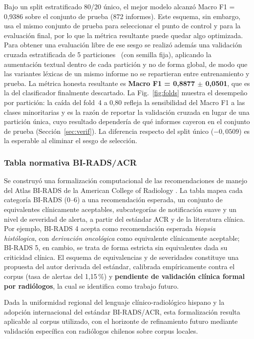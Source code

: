 \documentclass[10pt,journal,a4paper]{IEEEtran}
\begin{document}
Bajo un split estratificado 80/20 \'unico, el mejor modelo alcanz\'o Macro F1 = 0,9386 sobre el conjunto de prueba (872 informes). Este esquema, sin embargo, usa el mismo conjunto de prueba para seleccionar el punto de control y para la evaluaci\'on final, por lo que la m\'etrica resultante puede quedar algo optimizada. Para obtener una evaluaci\'on libre de ese sesgo se realiz\'o adem\'as una validaci\'on cruzada estratificada de 5 particiones~\cite{kohavi1995study} (con semilla fija), aplicando la aumentaci\'on textual dentro de cada partici\'on y no de forma global, de modo que las variantes l\'exicas de un mismo informe no se repartieran entre entrenamiento y prueba. La m\'etrica honesta resultante es \textbf{Macro F1 = 0,8877 $\pm$ 0,0501}, que es la del clasificador finalmente descartado. La Fig.~\ref{fig:folds} muestra el desempe\~no por partici\'on: la ca\'ida del fold~4 a 0,80 refleja la sensibilidad del Macro F1 a las clases minoritarias y es la raz\'on de reportar la validaci\'on cruzada en lugar de una partici\'on \'unica, cuyo resultado depender\'ia de qu\'e informes cayeron en el conjunto de prueba (Secci\'on~\ref{sec:verif}). La diferencia respecto del split \'unico ($-0,0509$) es la esperable al eliminar el sesgo de selecci\'on.

\subsubsection{Tabla normativa BI-RADS/ACR}
Se construy\'o una formalizaci\'on computacional de las recomendaciones de manejo del Atlas BI-RADS de la American College of Radiology \cite{acr2013}. La tabla mapea cada categor\'ia BI-RADS (0--6) a una recomendaci\'on esperada, un conjunto de equivalentes cl\'inicamente aceptables, subcategor\'ias de notificaci\'on suave y un nivel de severidad de alerta, a partir del est\'andar ACR y de la literatura cl\'inica. Por ejemplo, BI-RADS 4 acepta como recomendaci\'on esperada \emph{biopsia hist\'ologica}, con \emph{derivaci\'on oncol\'ogica} como equivalente cl\'inicamente aceptable; BI-RADS 5, en cambio, se trata de forma estricta sin equivalentes dada su criticidad cl\'inica. El esquema de equivalencias y de severidades constituye una propuesta del autor derivada del est\'andar, calibrada emp\'iricamente contra el corpus (tasa de alertas del 1,15\,\%) y \textbf{pendiente de validaci\'on cl\'inica formal por radi\'ologos}, la cual se identifica como trabajo futuro.

Dada la uniformidad regional del lenguaje cl\'inico-radiol\'ogico hispano y la adopci\'on internacional del est\'andar BI-RADS/ACR, esta formalizaci\'on resulta aplicable al corpus utilizado, con el horizonte de refinamiento futuro mediante validaci\'on espec\'ifica con radi\'ologos chilenos sobre corpus locales.
\end{document}
